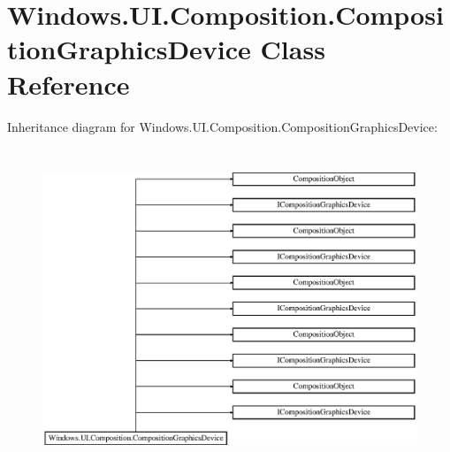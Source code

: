 \hypertarget{class_windows_1_1_u_i_1_1_composition_1_1_composition_graphics_device}{}\section{Windows.\+U\+I.\+Composition.\+Composition\+Graphics\+Device Class Reference}
\label{class_windows_1_1_u_i_1_1_composition_1_1_composition_graphics_device}
Inheritance diagram for Windows.\+U\+I.\+Composition.\+Composition\+Graphics\+Device\+:\begin{figure}[H]
\begin{center}
\leavevmode
\includegraphics[height=9.625000cm]{class_windows_1_1_u_i_1_1_composition_1_1_composition_graphics_device}
\end{center}
\end{figure}
